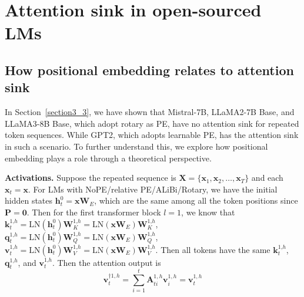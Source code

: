 \section{Attention sink in open-sourced LMs}

\subsection{How positional embedding relates to attention sink}\label{explain_pe}

In Section~\ref{section3_3}, we have shown that Mistral-7B, LLaMA2-7B Base, and LLaMA3-8B Base, which adopt rotary as PE, have no attention sink for repeated token sequences. While GPT2, which adopts learnable PE, has the attention sink in such a scenario. To further understand this, we explore how positional embedding plays a role through a theoretical perspective.

\textbf{Activations.} Suppose the repeated sequence is $\boldsymbol{X}=\{\boldsymbol{x}_1\textrm{,}\,\boldsymbol{x}_2\textrm{,}\,\ldots\textrm{,}\,\boldsymbol{x}_T\}$ and each $\boldsymbol{x}_t=\boldsymbol{x}$. For LMs with NoPE/relative PE/ALiBi/Rotary, we have the initial hidden states $\boldsymbol{h}_t^{0}=\boldsymbol{x}\boldsymbol{W}_E$, which are the same among all the token positions since $\boldsymbol{P}=\boldsymbol{0}$. Then for the first transformer block $l=1$, we know that $\boldsymbol{k}_t^{1\textrm{,}h}=\textrm{LN}(\boldsymbol{h}_t^{0})\boldsymbol{W}_{K}^{1\textrm{,}h}=\textrm{LN}(\boldsymbol{x}\boldsymbol{W}_E)\boldsymbol{W}_{K}^{1\textrm{,}h}$, $\boldsymbol{q}_t^{1\textrm{,}h}=\textrm{LN}(\boldsymbol{h}_t^{0})\boldsymbol{W}_{Q}^{1\textrm{,}h}=\textrm{LN}(\boldsymbol{x}\boldsymbol{W}_E)\boldsymbol{W}_{Q}^{1\textrm{,}h}$, $\boldsymbol{v}_t^{1\textrm{,}h}=\textrm{LN}(\boldsymbol{h}_t^{0})\boldsymbol{W}_{V}^{1\textrm{,}h}=\textrm{LN}(\boldsymbol{x}\boldsymbol{W}_E)\boldsymbol{W}_{V}^{1\textrm{,}h}$. Then all tokens have the same $\boldsymbol{k}_t^{1\textrm{,}h}$, $\boldsymbol{q}_t^{1\textrm{,}h}$, and $\boldsymbol{v}_t^{1\textrm{,}h}$. Then the attention output is
\begin{equation}
\boldsymbol{v}_t^{\dagger 1\textrm{,}\,h}=\sum_{i=1}^t\boldsymbol{A}_{ti}^{1\textrm{,}\,h}\boldsymbol{v}_i^{1\textrm{,}\,h}=\boldsymbol{v}_t^{1\textrm{,}\,h}
\end{equation}


